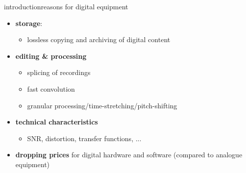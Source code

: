 \begin{frame}{introduction}{reasons for digital equipment}
	\begin{itemize}
        \item   \textbf{storage}:
            \begin{itemize}
                \item   lossless copying and archiving of digital content
            \end{itemize}
        \pause
        \item   \textbf{editing \& processing} 
            \begin{itemize}
                \item   splicing of recordings
                \item   fast convolution
                \item   granular processing/time-stretching/pitch-shifting
            \end{itemize}
        \pause
		\item	\textbf{technical characteristics}
			\begin{itemize}
				\item	SNR, distortion, transfer functions, ...
			\end{itemize}
            \bigskip
        \pause
        \item   \textbf{dropping prices} for digital hardware and software (compared to analogue equipment)
    \end{itemize}
\end{frame}

